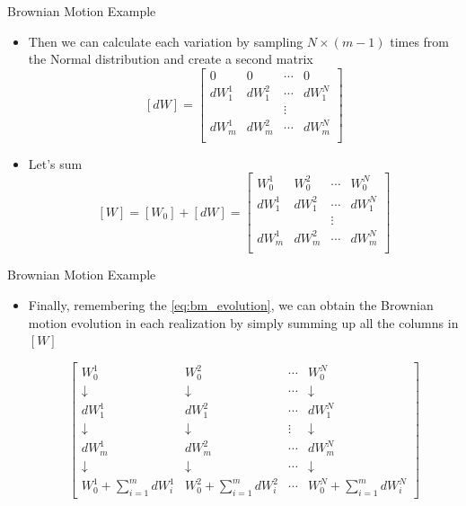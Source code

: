 \documentclass{beamer}
\begin{document}
\begin{frame}{Brownian Motion Example}
\begin{itemize}
    \item Then we can calculate each variation by sampling $N\times (m-1)$ times from the Normal distribution and create a second matrix 
    $$
    [dW] =
    \begin{bmatrix}
    0 & 0 & \cdots & 0 \\
    dW^1_1 & dW^2_1 & \cdots & dW^N_1 \\
     &  & \vdots &   \\
    dW^1_{m} & dW^2_{m} & \cdots & dW^N_{m} \\
    \end{bmatrix}
    $$  
    \item Let's sum 
    $$[W] = [W_0] + [dW] =
    \begin{bmatrix}
    W^1_0 & W^2_0 & \cdots & W^N_0 \\
    dW^1_1 & dW^2_1 & \cdots & dW^N_1 \\
     &  & \vdots &   \\
    dW^1_{m} & dW^2_{m} & \cdots & dW^N_{m} \\
    \end{bmatrix}
    $$  
\end{itemize}
\end{frame}

\begin{frame}{Brownian Motion Example}
\begin{itemize}
    \item Finally, remembering the \cref{eq:bm_evolution}, we can obtain the Brownian motion evolution in each realization by simply summing up all the columns in $[W]$

\[\left[
\begin{array}{cccc}
W^1_0 & W^2_0 & \cdots & W^N_0 \\
\downarrow & \downarrow & \cdots & \downarrow \\
dW^1_1 & dW^2_1 & \cdots & dW^N_1 \\
\downarrow & \downarrow & \vdots & \downarrow \\
dW^1_{m} & dW^2_{m} & \cdots & dW^N_{m} \\
\downarrow & \downarrow & \cdots & \downarrow \\
W^1_0+\sum\limits_{i=1}^{m} dW^1_i & W^2_0+\sum\limits_{i=1}^{m} dW^2_i & \cdots & W^N_0+\sum\limits_{i=1}^{m} dW^N_i
\end{array}\right]
\]
\end{itemize}
\end{frame}
\end{document}
